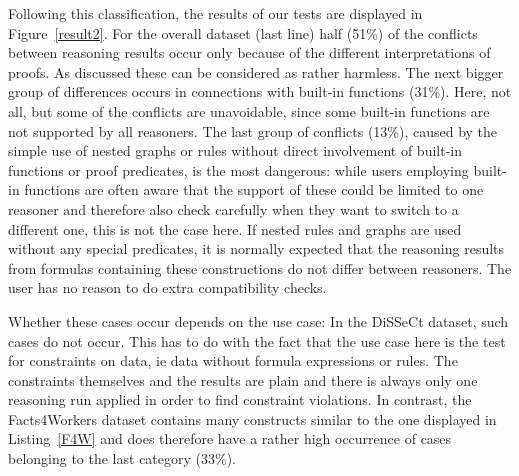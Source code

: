 Following this classification, the results of our tests are displayed in Figure~\ref{result2}.
For the overall dataset (last line) half (51\%) of the conflicts between reasoning results occur only because of the different interpretations of proofs. 
As discussed these can be considered as rather harmless. %
The next bigger group of differences occurs in connections with built-in functions (31\%). 
Here, not all, but some of the conflicts are unavoidable,
since some built-in functions are not supported by all reasoners. The last group of conflicts (13\%), caused by the simple use of nested graphs or rules 
without direct involvement of built-in functions or proof predicates,  is the most dangerous: while users employing built-in functions are often
aware that the support of these could be limited to one reasoner and therefore also check carefully when they want to switch to a different one, 
this is not the case here. If nested rules and graphs are used without
any special predicates, it is normally expected that the reasoning results from formulas containing these constructions do not differ between reasoners. 
The user  has no reason to do extra compatibility checks.

Whether these cases occur depends on the use case: 
In the DiSSeCt dataset, such cases do not occur. This has to do with the fact that the use case here is the test for constraints on \rdf data, ie data 
without formula expressions 
or rules. 
The constraints themselves and the results
are plain \rdf and there is always only one reasoning run applied in order to find constraint violations. In contrast, the Facts4Workers dataset contains
many constructs similar to the one displayed in Listing~\ref{F4W} and does therefore have a rather high occurrence of cases belonging to the last category (33\%).

